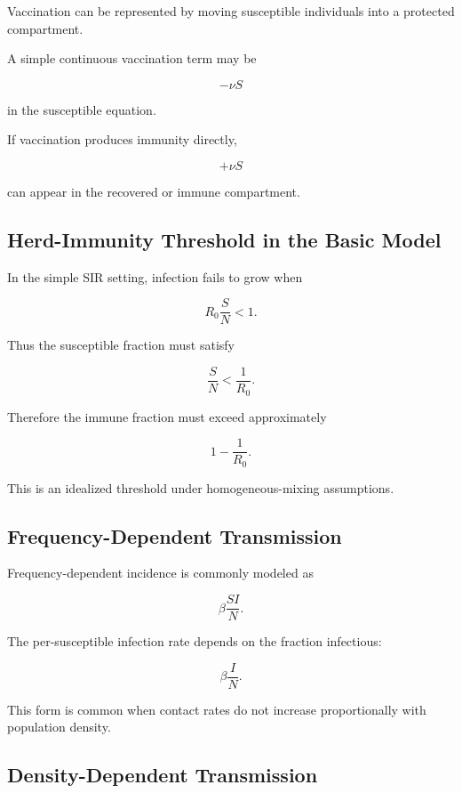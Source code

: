 Vaccination can be represented by moving susceptible individuals into a
protected compartment.

A simple continuous vaccination term may be

\[
\boxed{
-\nu S
}
\]

in the susceptible equation.

If vaccination produces immunity directly,

\[
\boxed{
+\nu S
}
\]

can appear in the recovered or immune compartment.

\subsection{Herd-Immunity Threshold in the Basic Model}
\label{subsec:herd-immunity-threshold}

In the simple SIR setting, infection fails to grow when

\[
R_0\frac{S}{N}<1.
\]

Thus the susceptible fraction must satisfy

\[
\frac{S}{N}
<
\frac1{R_0}.
\]

Therefore the immune fraction must exceed approximately

\[
\boxed{
1-\frac1{R_0}.
}
\]

This is an idealized threshold under homogeneous-mixing assumptions.

\subsection{Frequency-Dependent Transmission}
\label{subsec:frequency-dependent-transmission}

Frequency-dependent incidence is commonly modeled as

\[
\boxed{
\beta\frac{SI}{N}.
}
\]

The per-susceptible infection rate depends on the fraction infectious:

\[
\boxed{
\beta\frac{I}{N}.
}
\]

This form is common when contact rates do not increase proportionally with
population density.

\subsection{Density-Dependent Transmission}
\label{subsec:density-dependent-transmission}

